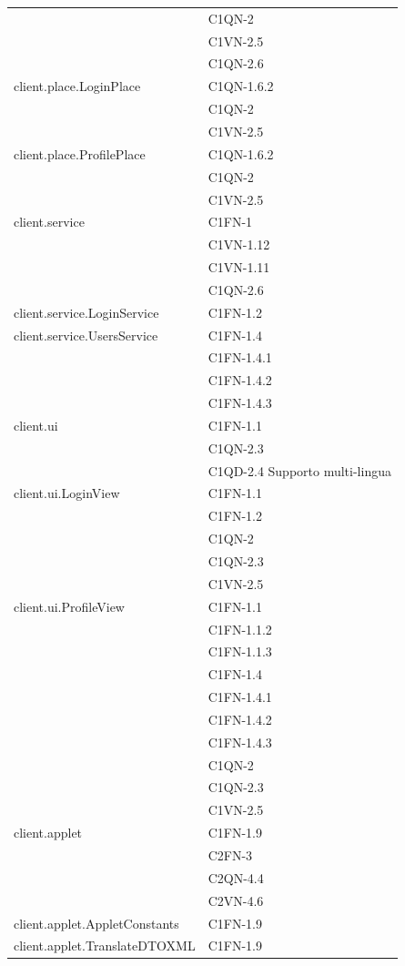 \begin{footnotesize}
\begin{longtable}[!h]{|l|l|}
& C1QN-2 \\
& C1VN-2.5\\
& C1QN-2.6\\\hline 
client.place.LoginPlace  &  C1QN-1.6.2\\
& C1QN-2 \\
& C1VN-2.5\\\hline 
client.place.ProfilePlace  &  C1QN-1.6.2\\
& C1QN-2\\
& C1VN-2.5\\\hline
client.service  &  C1FN-1\\
& C1VN-1.12\\
& C1VN-1.11\\
& C1QN-2.6 \\\hline 
client.service.LoginService  &  C1FN-1.2 \\\hline 
client.service.UsersService  &  C1FN-1.4\\
& C1FN-1.4.1\\
& C1FN-1.4.2\\
& C1FN-1.4.3\\\hline 
client.ui  &  C1FN-1.1\\
& C1QN-2.3\\
& C1QD-2.4 Supporto multi-lingua\\\hline
client.ui.LoginView  &  C1FN-1.1\\
& C1FN-1.2\\
& C1QN-2\\
& C1QN-2.3\\
& C1VN-2.5\\\hline 
client.ui.ProfileView  & C1FN-1.1\\
& C1FN-1.1.2\\
& C1FN-1.1.3\\
& C1FN-1.4\\
& C1FN-1.4.1\\
& C1FN-1.4.2\\
& C1FN-1.4.3\\
& C1QN-2\\
& C1QN-2.3\\
& C1VN-2.5\\\hline 
client.applet  &  C1FN-1.9\\
& C2FN-3\\
& C2QN-4.4\\
& C2VN-4.6\\\hline 
client.applet.AppletConstants  &  C1FN-1.9 \\\hline 
client.applet.TranslateDTOXML  &  C1FN-1.9\\

\end{longtable}
\end{footnotesize}
